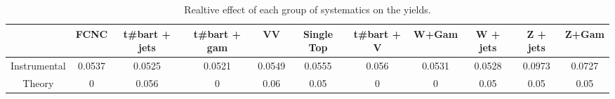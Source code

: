 \begin{table}[htbp]
\begin{center}
\begin{tabular}{|c|c|c|c|c|c|c|c|c|c|c|}
\hline 
      & FCNC      & t#bar{t} + jets      & t#bar{t} +  gam      & VV      & Single Top      & t#bar{t} + V      & W+Gam      & W + jets      & Z + jets      & Z+Gam \\ 
\hline 
 Instrumental & 0.0537 & 0.0525 & 0.0521 & 0.0549 & 0.0555 & 0.056 & 0.0531 & 0.0528 & 0.0973 & 0.0727 \\ 
 Theory & 0 & 0.056 & 0 & 0.06 & 0.05 & 0 & 0 & 0.05 & 0.05 & 0.05 \\ 
\hline 
\end{tabular} 
\caption{Realtive effect of each group of systematics on the yields.} 
\end{center} 
\end{table} 
